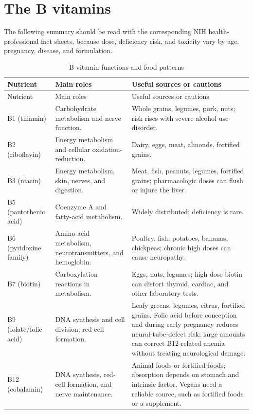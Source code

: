 \section{The B vitamins}
The following summary should be read with the corresponding NIH health-professional fact sheets, because dose, deficiency risk, and toxicity vary by age, pregnancy, disease, and formulation. \cite{odsList}
\begin{longtable}{p{}p{}p{}}
\caption{B-vitamin functions and food patterns}\\
\toprule
Nutrient & Main roles & Useful sources or cautions \\
\midrule
\endfirsthead
\toprule Nutrient & Main roles & Useful sources or cautions \\
\midrule
\endhead
B1 (thiamin) & Carbohydrate metabolism and nerve function. & Whole grains, legumes, pork, nuts; risk rises with severe alcohol use disorder. \cite{odsThiamin}\\
B2 (riboflavin) & Energy metabolism and cellular oxidation-reduction. & Dairy, eggs, meat, almonds, fortified grains. \cite{odsRiboflavin}\\
B3 (niacin) & Energy metabolism, skin, nerves, and digestion. & Meat, fish, peanuts, legumes, fortified grains; pharmacologic doses can flush or injure the liver. \cite{odsNiacin}\\
B5 (pantothenic acid) & Coenzyme A and fatty-acid metabolism. & Widely distributed; deficiency is rare. \cite{odsPantothenic}\\
B6 (pyridoxine family) & Amino-acid metabolism, neurotransmitters, and hemoglobin. & Poultry, fish, potatoes, bananas, chickpeas; chronic high doses can cause neuropathy. \cite{odsB6}\\
B7 (biotin) & Carboxylation reactions in metabolism. & Eggs, nuts, legumes; high-dose biotin can distort thyroid, cardiac, and other laboratory tests. \cite{odsBiotin}\\
B9 (folate/folic acid) & DNA synthesis and cell division; red-cell formation. & Leafy greens, legumes, citrus, fortified grains. Folic acid before conception and during early pregnancy reduces neural-tube-defect risk; large amounts can correct B12-related anemia without treating neurological damage. \cite{odsFolate}\\
B12 (cobalamin) & DNA synthesis, red-cell formation, and nerve maintenance. & Animal foods or fortified foods; absorption depends on stomach and intrinsic factor. Vegans need a reliable source, such as fortified foods or a supplement. \cite{odsB12}\\
\bottomrule
\end{longtable}

